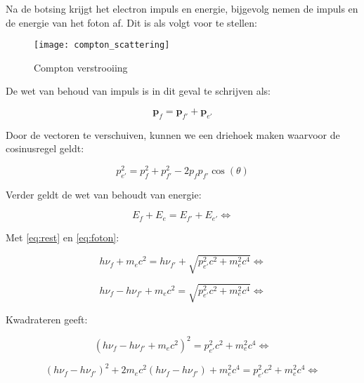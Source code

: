 Na de botsing krijgt het electron impuls en energie, bijgevolg nemen
de impuls en de energie van het foton af. Dit is als volgt voor te
stellen:

\begin{figure}[H]
\centering
\texttt{[image: compton\_scattering]}

\caption{Compton verstrooiing}
\end{figure}


De wet van behoud van impuls is in dit geval te schrijven als:

\begin{equation}
\mathbf{p}_{f}=\mathbf{p}_{f'}+\mathbf{p}_{e'}
\end{equation}


Door de vectoren te verschuiven, kunnen we een driehoek maken waarvoor
de cosinusregel geldt:

\begin{equation} \label{eq:cosinus}
p_{e'}^{2}=p_{f}^{2}+p_{f'}^{2}-2p_{f}p_{f'}\cos\left(\theta\right)
\end{equation}


Verder geldt de wet van behoudt van energie:

\begin{equation}
E_{f}+E_{e}=E_{f'}+E_{e'}\Longleftrightarrow
\end{equation}


Met \ref{eq:rest} en \ref{eq:foton}:

\begin{equation}
h\nu_{f}+m_{e}c^{2}=h\nu_{f'}+\sqrt{p_{e'}^{2}c^{2}+m_{e}^{2}c^{4}}\Longleftrightarrow
\end{equation}


\begin{equation}
h\nu_{f}-h\nu_{f'}+m_{e}c^{2}=\sqrt{p_{e'}^{2}c^{2}+m_{e}^{2}c^{4}}\Longleftrightarrow
\end{equation}


Kwadrateren geeft:

\begin{equation}
\left(h\nu_{f}-h\nu_{f'}+m_{e}c^{2}\right)^{2}=p_{e'}^{2}c^{2}+m_{e}^{2}c^{4}\Longleftrightarrow
\end{equation}


\begin{equation}
\left(h\nu_{f}-h\nu_{f'}\right)^{2}+2m_{e}c^{2}\left(h\nu_{f}-h\nu_{f'}\right)+m_{e}^{2}c^{4}=p_{e'}^{2}c^{2}+m_{e}^{2}c^{4}\Longleftrightarrow
\end{equation}


